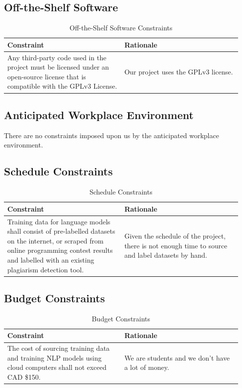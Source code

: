\documentclass[12pt]{article}
\begin{document}
\subsection{Off-the-Shelf Software}
\begin{table}[h!]
    \centering
    \begin{tabular}{| p{0.475\linewidth} | p{0.475\linewidth} |}
    \hline
    \textbf{Constraint}   & \textbf{Rationale} \\
    \hline
    Any third-party code used in the project must be licensed under an open-source license that is compatible with the GPLv3 License. &
    Our project uses the GPLv3 license. \\
    \hline
    \end{tabular}
    \caption{ Off-the-Shelf Software Constraints}
\end{table}

\newpage
\subsection{Anticipated Workplace Environment}
There are no constraints imposed upon us by the anticipated workplace environment.


\subsection{Schedule Constraints}
\begin{table}[h!]
    \centering
    \begin{tabular}{| p{0.475\linewidth} | p{0.475\linewidth} |}
    \hline
    \textbf{Constraint}   & \textbf{Rationale} \\
    \hline
    Training data for language models shall consist of pre-labelled datasets on the internet, or scraped from online programming contest results and labelled with an existing plagiarism detection tool. &
    Given the schedule of the project, there is not enough time to source and label datasets by hand. \\
    \hline
    \end{tabular}
    \caption{ Schedule Constraints} 
\end{table}


\subsection{Budget Constraints}
\begin{table}[h!]
    \centering
    \begin{tabular}{| p{0.475\linewidth} | p{0.475\linewidth} |}
    \hline
    \textbf{Constraint}   & \textbf{Rationale} \\
    \hline
    The cost of sourcing training data and training NLP models using cloud computers shall not exceed CAD \$150. &
    We are students and we don't have a lot of money. \\
    \hline
    \end{tabular}
    \caption{ Budget Constraints}
\end{table}
\end{document}
